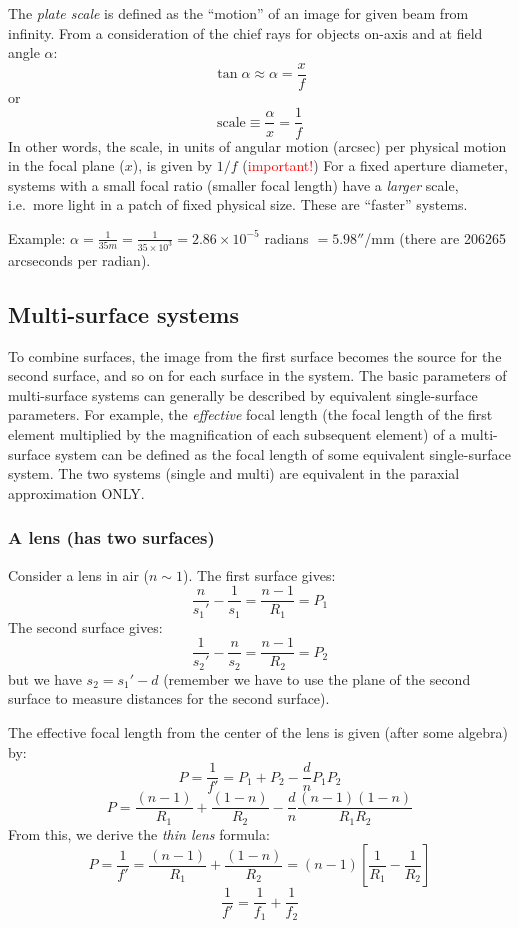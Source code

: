 \documentclass[12pt]{article}
\begin{document}
The \textit{plate scale} is defined as the ``motion'' of an image for given
beam from infinity. From a consideration of the chief rays for objects on-axis
and at field angle $\alpha$:
\[
    \tan{\alpha} \approx \alpha = \frac{x}{f}
    \]
or
\[
    \textrm{scale} \equiv \frac{\alpha}{x} = \frac{1}{f}
    \]
In other words, the scale, in units of angular motion (arcsec) per physical
motion in the focal plane ($x$), is given by $1/f$
(\textcolor{red}{important!}) For a fixed aperture diameter, systems with a
small focal ratio (smaller focal length) have a \emph{larger} scale, i.e.\ more
light in a patch of fixed physical size. These are ``faster'' systems.

Example:
$\alpha = \frac{1}{35m} = \frac{1}{35\times10^{3}} = 2.86\times10^{-5}$
radians $ = 5.98''$/mm (there are 206265 arcseconds per radian).

\subsection{Multi-surface systems}
To combine surfaces, the image from the first surface becomes the source for
the second surface, and so on for each surface in the system. The basic
parameters of multi-surface systems can generally be described by equivalent
single-surface parameters. For example, the \textit{effective} focal length
(the focal length of the first element multiplied by the magnification of each
subsequent element) of a multi-surface system can be defined as the focal
length of some equivalent single-surface system. The two systems (single and
multi) are equivalent in the paraxial approximation ONLY\@.

\subsubsection{A lens (has two surfaces)}
Consider a lens in air ($n \sim 1$). The first surface gives:
\[
    \frac{n}{s_{1}'}-\frac{1}{s_{1}} = \frac{n-1}{R_{1}}=P_{1}
    \]
The second surface gives:
\[
    \frac{1}{s_{2}'}-\frac{n}{s_{2}} = \frac{n-1}{R_{2}}=P_{2}
    \]
but we have $s_{2} = s_{1}'-d$ (remember we have to use the plane of the
second surface to measure distances for the second surface).

The effective focal length from the center of the lens
is given (after some algebra) by:
\[
    P=\frac{1}{f'}=P_{1}+P_{2}-\frac{d}{n}P_{1}P_{2}
    \]
\[
    P=\frac{(n-1)}{R_{1}}+\frac{(1-n)}{R_{2}}-\frac{d}{n}
    \frac{(n-1)(1-n)}{R_{1}R_{2}}
    \]
From this, we derive the \textit{thin lens} formula:
\[
    P
    = \frac{1}{f'}
    = \frac{(n-1)}{R_{1}}+\frac{(1-n)}{R_{2}}
    = (n-1) \left[ \frac{1}{R_{1}} - \frac{1}{R_{2}} \right]
    \]
\[
    \frac{1}{f'} = \frac{1}{f_{1}} + \frac{1}{f_{2}}
    \]
\end{document}
